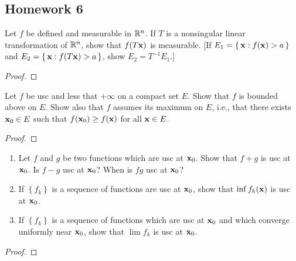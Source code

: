 \subsection{Homework 6}
\begin{problem}
Let $f$ be defined and measurable in $\mathbb{R}^n$. If $T$ is a nonsingular
linear transformation of $\mathbb{R}^n$, show that $f(T\mathbf{x})$ is measurable. [If
$E_1=\left\{\,\mathbf{x}: f(\mathbf{x})>a\,\right\}$ and
$E_2=\left\{\,\mathbf{x}:f(T\mathbf{x})>a\,\right\}$, show $E_2=T^{-1}E_1$.]
\end{problem}
\begin{proof}
\end{proof}

\begin{problem}
Let $f$ be usc and less that $+\infty$ on a compact set $E$. Show that $f$
is bounded above on $E$. Show also that $f$ assumes its maximum on $E$,
i.e., that there exists $\mathbf{x}_0\in E$ such that $f(\mathbf{x}_0)\geq f(\mathbf{x})$ for
all $\mathbf{x}\in E$.
\end{problem}
\begin{proof}
\end{proof}

\begin{problem}
\begin{enumerate}[label=(\alph*),noitemsep]
\item Let $f$ and $g$ be two functions which are usc at $\mathbf{x}_0$. Show that
  $f+g$ is usc at $\mathbf{x}_0$. Is $f-g$ usc at $\mathbf{x}_0$? When is $fg$ usc at
  $\mathbf{x}_0$?
\item If $\left\{f_k\right\}$ is a sequence of functions are usc at
  $\mathbf{x}_0$, show that $\inf f_k(\mathbf{x})$ is usc at $\mathbf{x}_0$.
\item If $\left\{f_k\right\}$ is a sequence of functions which are usc at
  $\mathbf{x}_0$ and which converge uniformly near $\mathbf{x}_0$, show that $\lim f_k$
  is usc at $\mathbf{x}_0$.
\end{enumerate}
\end{problem}
\begin{proof}
\end{proof}

